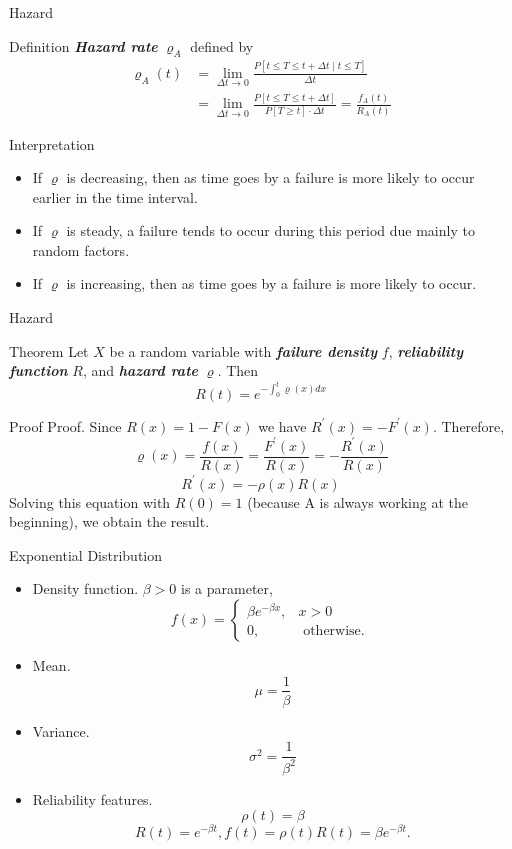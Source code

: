 \documentclass{beamer}
\newcommand{\bb}[1]{\textcolor{antiquefuchsia}{\textbf{\textit{#1}}}}
\begin{document}
\begin{frame}{Hazard}
\begin{block}{Definition}
\bb{Hazard rate} $\varrho_{A}$ defined by
$$
\begin{aligned}
\varrho_{A}(t) &=\lim _{\Delta t \rightarrow 0} \frac{P[t \leq T \leq t+\Delta t \mid t \leq T]}{\Delta t} \\
&=\lim _{\Delta t \rightarrow 0} \frac{P[t \leq T \leq t+\Delta t]}{P[T \geq t] \cdot \Delta t}=\frac{f_{A}(t)}{R_{A}(t)}
\end{aligned}
$$
\end{block}
\begin{block}{Interpretation}
\begin{itemize}
\item If $\varrho$ is decreasing, then as time goes by a failure is more likely to occur earlier in the time interval.
\item If $\varrho$ is steady, a failure tends to occur during this period due mainly to random factors.
\item If $\varrho$ is increasing, then as time goes by a failure is more likely to occur.
\end{itemize}
\end{block}
\end{frame}

\begin{frame}{Hazard}
\begin{block}{Theorem}
Let $X$ be a random variable with \bb{failure density} $f$, \bb{reliability function} $R$, and \bb{hazard rate} $\varrho$. Then
$$
R(t)=e^{-\int_{0}^{t} \varrho(x) d x}
$$
\end{block}
\begin{block}{Proof}
Proof.
Since $R(x)=1-F(x)$ we have $R^{\prime}(x)=-F^{\prime}(x)$. Therefore,
$$
\varrho(x)=\frac{f(x)}{R(x)}=\frac{F^{\prime}(x)}{R(x)}=-\frac{R^{\prime}(x)}{R(x)}
$$
$$
R^{\prime}(x)=-\rho(x) R(x)
$$
Solving this equation with $R(0)=1$ (because A is always working at the beginning), we obtain the result.
\end{block}
\end{frame}


\begin{frame}{Exponential Distribution}
\begin{itemize}
\item Density function. $\beta>0$ is a parameter,
$$
f(x)= \begin{cases}\beta e^{-\beta x}, & x>0 \\ 0, & \text { otherwise. }\end{cases}
$$
\item Mean.
$$
\mu=\frac{1}{\beta}
$$
\item Variance.
$$
\sigma^{2}=\frac{1}{\beta^{2}}
$$
\item Reliability features.
$$
\rho(t)=\beta$$$$R(t)=e^{-\beta t}, f(t)=\rho(t) R(t)=\beta e^{-\beta t} .
$$
\end{itemize}
\end{frame}
\end{document}
